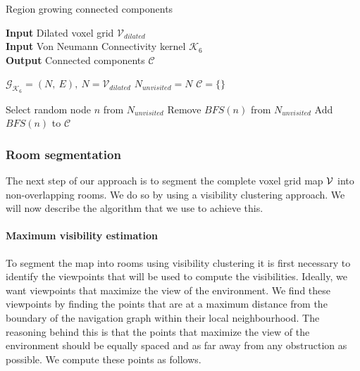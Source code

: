 \begin{algorithm}
    
    \caption{Region growing connected components}\label{alg:cap}
    \hspace*{\algorithmicindent} \textbf{Input} Dilated voxel grid \(\mathcal{V}_{dilated}\) \\
    \hspace*{\algorithmicindent} \textbf{Input} Von Neumann Connectivity kernel \(\mathcal{K}_6\) \\
    \hspace*{\algorithmicindent} \textbf{Output} Connected components \(\mathcal{C}\) \\

    \begin{algorithmic}
        \label{algo:connected}

    \State \(\mathcal{G}_{\mathcal{K}_6} = (N,\ E),\ N = \mathcal{V}_{dilated}\) 
    \State \(N_{unvisited} = N\)
    \State \(\mathcal{C} = \{\}\)
    
        \State Select random node \(n\) from \(N_{unvisited}\)
        \State Remove \(BFS(n)\) from \(N_{unvisited}\) 
        \State Add \(BFS(n)\) to \(\mathcal{C}\)
    \EndWhile
    \end{algorithmic}
\end{algorithm}

\subsubsection{Room segmentation}
The next step of our approach is to segment the complete voxel grid map \(\mathcal{V}\) into non-overlapping rooms. We do so by using a visibility clustering approach. We will now describe the algorithm that we use to achieve this.

\paragraph{Maximum visibility estimation}
To segment the map into rooms using visibility clustering it is first necessary to identify the viewpoints that will be used to compute the visibilities. Ideally, we want viewpoints that maximize the view of the environment. We find these viewpoints by finding the points that are at a maximum distance from the boundary of the navigation graph within their local neighbourhood. The reasoning behind this is that the points that maximize the view of the environment should be equally spaced and as far away from any obstruction as possible. We compute these points as follows.

